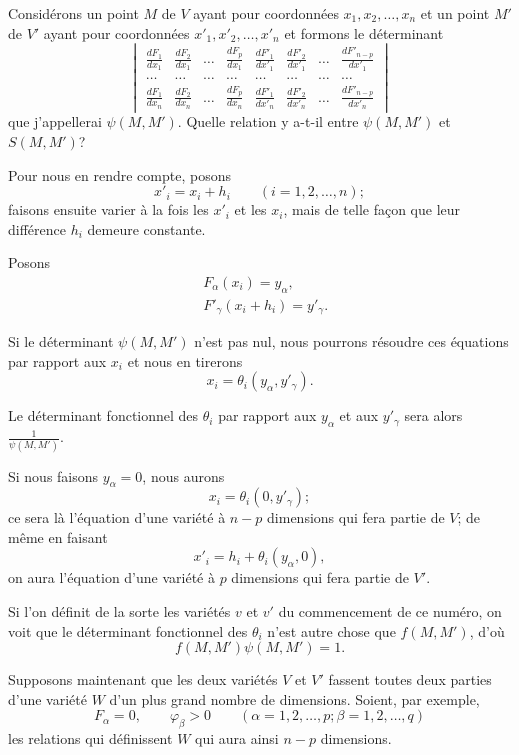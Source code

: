 \documentclass{article}
\begin{document}
Considérons un point $M$ de $V$ ayant pour coordonnées $x_{1}, x_{2}, \ldots, x_{n}$ et un point $M'$ de $V'$ ayant pour coordonnées $x'_{1}, x'_{2}, \ldots, x'_{n}$ et formons le déterminant
\[
\begin{vmatrix}
\frac{dF_{1}}{dx_{1}} & \frac{dF_{2}}{dx_{1}} & \ldots & \frac{dF_{p}}{dx_{1}} & \frac{dF'_{1}}{dx'_{1}} & \frac{dF'_{2}}{dx'_{1}} & \ldots & \frac{dF'_{n-p}}{dx'_{1}} \\[1ex]
\ldots & \ldots & \ldots & \ldots & \ldots & \ldots & \ldots & \ldots \\[1ex]
\frac{dF_{1}}{dx_{n}} & \frac{dF_{2}}{dx_{n}} & \ldots & \frac{dF_{p}}{dx_{n}} & \frac{dF'_{1}}{dx'_{n}} & \frac{dF'_{2}}{dx'_{n}} & \ldots & \frac{dF'_{n-p}}{dx'_{n}}
\end{vmatrix}
\]
que j'appellerai $\psi(M, M')$. Quelle relation y a-t-il entre $\psi(M, M')$ et $S(M, M')$?

Pour nous en rendre compte, posons
\[
x'_{i} = x_{i} + h_{i} \qquad (i = 1, 2, \ldots, n);
\]
faisons ensuite varier à la fois les $x'_{i}$ et les $x_{i}$, mais de telle façon que leur différence $h_{i}$ demeure constante.

Posons
\[
\begin{aligned}
&F_{\alpha}(x_{i}) = y_{\alpha},\\
&F'_{\gamma}(x_{i} + h_{i}) = y'_{\gamma}.
\end{aligned}
\]

Si le déterminant $\psi(M, M')$ n'est pas nul, nous pourrons résoudre ces
équations par rapport aux $x_{i}$ et nous en tirerons
\[
x_{i} = \theta_{i}(y_{\alpha}, y'_{\gamma}).
\]

Le déterminant fonctionnel des $\theta_{i}$ par rapport aux $y_{\alpha}$ et aux $y'_{\gamma}$ sera alors $\frac{1}{\psi(M, M')}$.

Si nous faisons $y_{\alpha} = 0$, nous aurons
\[
x_{i} = \theta_{i}(0, y'_{\gamma});
\]
ce sera là l'équation d'une variété à $n-p$ dimensions qui fera partie de $V$; de même en faisant
\[
x'_{i} = h_{i} + \theta_{i}(y_{\alpha}, 0),
\]
on aura l'équation d'une variété à $p$ dimensions qui fera partie de $V'$.

Si l'on définit de la sorte les variétés $v$ et $v'$ du commencement de ce numéro, on voit que le déterminant fonctionnel des $\theta_{i}$ n'est autre chose que $f(M, M')$, d'où
\[
f(M, M')\psi(M, M') = 1.
\]

Supposons maintenant que les deux variétés $V$ et $V'$ fassent toutes deux parties d'une variété $W$ d'un plus grand nombre de dimensions. Soient, par exemple,
\[
F_{\alpha} = 0, \qquad \varphi_{\beta} > 0 \qquad (\alpha = 1, 2, \ldots, p; \beta = 1, 2, \ldots, q) \tag{1}
\]
les relations qui définissent $W$ qui aura ainsi $n-p$ dimensions.
\end{document}
